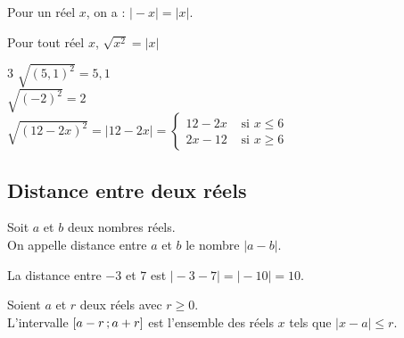 \begin{Remarque}
Pour un réel $x$, on a : $\vert -x \vert =\vert x \vert$.
\end{Remarque}

\begin{Propriété}
Pour tout réel $x$, $\sqrt{x^2}=\vert x\vert $
\end{Propriété}

\begin{Exemple}
\begin{multicols}{3}
\vspace{-0.5cm}
$\sqrt{(5,1)^2}=5,1$
\\
$\sqrt{ (-2)^2} =2$\\
$\sqrt{(12-2x)^2}=\vert 12-2x \vert =\left\{
    \begin{array}{ll}
        12-2x  & \text{ si } x\leq 6\\
        2x-12 &  \text{ si } x\geq 6
    \end{array}
\right.$

\end{multicols}
\vspace{-0.5cm}
\end{Exemple}




\newpage

\subsection{Distance entre deux réels}

\begin{Définition}
Soit $a$ et $b$ deux nombres réels.\\
On appelle distance entre $a$ et $b$ le nombre $\vert a-b \vert$.

\end{Définition}

\begin{Exemple}
La distance entre $-3$ et $7$ est $\vert -3 -7\vert =\vert -10\vert =10$.
\end{Exemple}

\begin{Propriété}
Soient $a$ et $r$ deux réels avec $r \geq 0$.\\
L'intervalle $\mathopen{[}a-r\,;a+r\mathclose{]}$ est l'ensemble des réels $x$ tels que $\vert x-a \vert \leq r$.

\end{Propriété}

